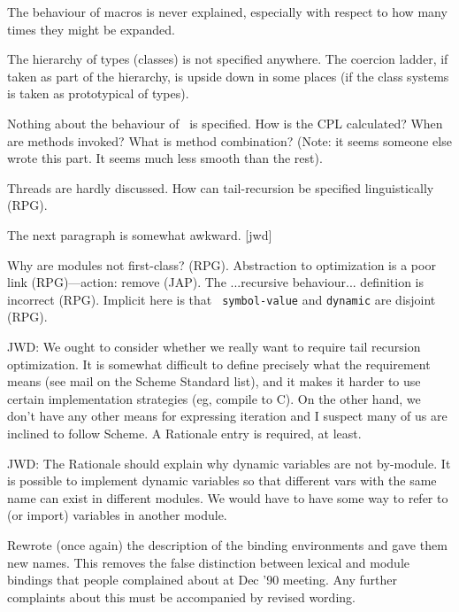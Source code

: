 \begin{introduction}
\label{sec:intro}
\begin{optPrivate}
    The behaviour of macros is never explained, especially with respect to how
    many times they might be expanded.

    The hierarchy of types (classes) is not specified anywhere.  The coercion
    ladder, if taken as part of the hierarchy, is upside down in some places (if
    the class systems is taken as prototypical of types).

    Nothing about the behaviour of \telos\ is specified.  How is the CPL
    calculated?  When are methods invoked?  What is method combination?  (Note:
    it seems someone else wrote this part.  It seems much less smooth than the
    rest).

    Threads are hardly discussed.  How can tail-recursion be specified
    linguistically (RPG).

    The next paragraph is somewhat awkward.  [jwd]

    Why are modules not first-class? (RPG).  Abstraction to optimization is a
    poor link (RPG)---action: remove (JAP).  The ...recursive
    behaviour... definition is incorrect (RPG).  Implicit here is that {\tt
        symbol-value} and {\tt dynamic} are disjoint (RPG).

    JWD: We ought to consider whether we really want to require tail recursion
    optimization.  It is somewhat difficult to define precisely what the
    requirement means (see mail on the Scheme Standard list), and it makes it
    harder to use certain implementation strategies (eg, compile to C).  On the
    other hand, we don't have any other means for expressing iteration and I
    suspect many of us are inclined to follow Scheme.  A Rationale entry is
    required, at least.

    JWD: The Rationale should explain why dynamic variables are not by-module.
    It is possible to implement dynamic variables so that different vars with
    the same name can exist in different modules.  We would have to have some
    way to refer to (or import) variables in another module.

    Rewrote (once again) the description of the binding environments and gave
    them new names.  This removes the false distinction between lexical and
    module bindings that people complained about at Dec '90 meeting.  Any
    further complaints about this must be accompanied by revised wording.
\end{optPrivate}


\end{introduction}
